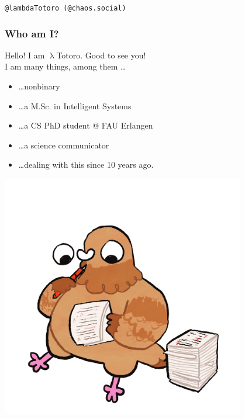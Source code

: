 \documentclass[aspectratio=169,x11names]{beamer}
\begin{document}
\begin{frame}
\begin{center}
\texttt{@lambdaTotoro (@chaos.social)}
\end{center}
\end{frame}

\begin{frame}
\frametitle{Who am I?}

\begin{minipage}{0.5\textwidth}
Hello! I am $\uplambda$Totoro. Good to see you!\\
I am many things, among them \dots
\bigskip

\begin{itemize}
\item\dots nonbinary\footnotemark
\item\dots a M.Sc. in Intelligent Systems
\item\dots a CS PhD student @ FAU Erlangen
\item\dots a science communicator
\item\dots dealing with this since 10 years ago.
\end{itemize}
\end{minipage}%
\begin{minipage}{0.5\textwidth}
\begin{center}
\includegraphics[width=0.8\textwidth,keepaspectratio]{images/pigeon_jonas} 
\end{center}
\end{minipage}
\end{frame}
\end{document}
